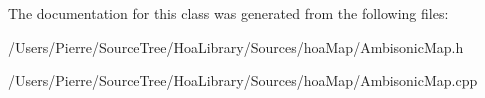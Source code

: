 The documentation for this class was generated from the following files\-:\begin{DoxyCompactItemize}
\item 
/\-Users/\-Pierre/\-Source\-Tree/\-Hoa\-Library/\-Sources/hoa\-Map/Ambisonic\-Map.\-h\item 
/\-Users/\-Pierre/\-Source\-Tree/\-Hoa\-Library/\-Sources/hoa\-Map/Ambisonic\-Map.\-cpp\end{DoxyCompactItemize}
